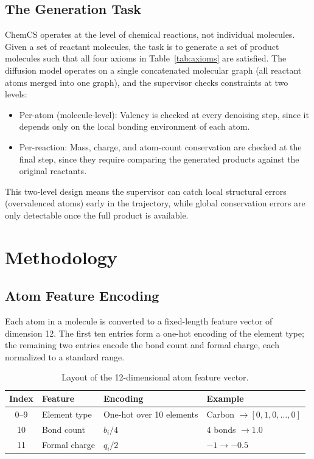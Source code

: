 \documentclass[11pt]{article}
\begin{document}
\subsection{The Generation Task}

ChemCS operates at the level of chemical reactions, not individual
molecules. Given a set of reactant molecules, the task is to generate a
set of product molecules such that all four axioms in
Table~\ref{tab:axioms} are satisfied. The diffusion model operates on a
single concatenated molecular graph (all reactant atoms merged into one
graph), and the supervisor checks constraints at two levels:

\begin{itemize}[nosep]
  \item Per-atom (molecule-level): Valency is checked at every denoising
        step, since it depends only on the local bonding environment of
        each atom.
  \item Per-reaction: Mass, charge, and atom-count conservation are
        checked at the final step, since they require comparing the
        generated products against the original reactants.
\end{itemize}

This two-level design means the supervisor can catch local structural
errors (overvalenced atoms) early in the trajectory, while global
conservation errors are only detectable once the full product is
available.

\section{Methodology}

\subsection{Atom Feature Encoding}

Each atom in a molecule is converted to a fixed-length feature vector
of dimension 12. The first ten entries form a one-hot encoding of the
element type; the remaining two entries encode the bond count and formal
charge, each normalized to a standard range.

\begin{table}[H]
\centering
\caption{Layout of the 12-dimensional atom feature vector.}
\label{tab:features}
\begin{tabular}{@{}clll@{}}
\toprule
Index & Feature & Encoding & Example \\
\midrule
0--9   & Element type & One-hot over 10 elements & Carbon $\to [0,1,0,\ldots,0]$ \\
10     & Bond count   & $b_i / 4$                & 4 bonds $\to 1.0$ \\
11     & Formal charge & $q_i / 2$               & $-1 \to -0.5$ \\
\bottomrule
\end{tabular}
\end{table}
\end{document}
